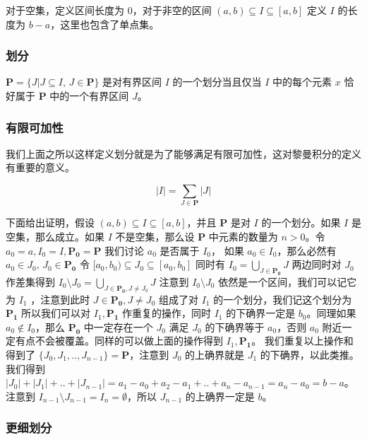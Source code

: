 对于空集，定义区间长度为 $0$，对于非空的区间 $(a,b) \subseteq I \subseteq [a,b]$ 定义 $I$ 的长度为 $b-a$，这里也包含了单点集。

\subsubsection{划分}

$\mathbf{P} = \{ J \vert J \subseteq I,\, J \in \mathbf{P} \}$ 是对有界区间 $I$ 的一个划分当且仅当 $I$ 中的每个元素 $x$ 恰好属于 $\mathbf{P}$ 中的一个有界区间 $J$。

\subsubsection{有限可加性}

我们上面之所以这样定义划分就是为了能够满足有限可加性，这对黎曼积分的定义有重要的意义。

\[
    \lvert I \rvert = \sum_{J \in \mathbf{P}} \lvert J \rvert
\]

下面给出证明，假设 $(a,b) \subseteq I \subseteq [a,b] $，并且 $\mathbf{P}$ 是对 $I$ 的一个划分。如果 $I$ 是空集，那么成立。如果 $I$ 不是空集，那么设 $\mathbf{P}$ 中元素的数量为 $n > 0$。令 $a_0=a, I_0 = I, \mathbf{P_0} = \mathbf{P}$ 我们讨论 $a_0$ 是否属于 $I_0$，
如果 $a_0 \in I_0$，那么必然有 $a_0 \in J_0 ,\, J_0 \in \mathbf{P_0}$ 令 $[a_0, b_0) \subseteq J_0 \subseteq [a_0, b_0]$ 同时有 $I_0 = \bigcup_{J \in \mathbf{P_0}} J $ 两边同时对 $J_0$ 作差集得到 $I_0 \setminus J_0 = \bigcup_{J \in \mathbf{P_0}, J \ne J_0}J$ 
注意到 $I_0 \setminus J_0$ 依然是一个区间，我们可以记它为 $I_1$ ，注意到此时 $J \in \mathbf{P_0}, J \ne J_0$ 组成了对 $I_1$ 的一个划分，我们记这个划分为 $\mathbf{P_1}$ 所以我们可以对 $I_1, \mathbf{P_1}$ 作重复的操作，同时 $I_1$ 的下确界一定是 $b_0$。同理如果 $a_0 \notin I_0$，那么 $\mathbf{P_0}$ 中一定存在一个 $J_0$ 满足 $J_0$ 的下确界等于 $a_0$，否则 $a_0$ 附近一定有点不会被覆盖。同样的可以做上面的操作得到 $I_1, \mathbf{P_1}$。
我们重复以上操作和得到了 $\{ J_0, J_1, .., J_{n-1} \} = \mathbf{P}$，注意到 $J_0$ 的上确界就是 $J_1$ 的下确界，以此类推。我们得到 $\lvert J_0 \rvert + \lvert J_1 \rvert  + .. + \lvert J_{n-1} \rvert = a_1 -a_0 + a_2 - a_1 + .. + a_n - a_{n-1} = a_n - a_0 = b - a$。
注意到 $I_{n-1} \setminus J_{n-1} = I_n = \emptyset$，所以 $J_{n-1}$ 的上确界一定是 $b$。

\subsubsection{更细划分}

